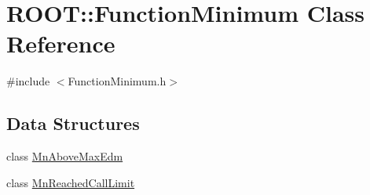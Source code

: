 \hypertarget{classROOT_1_1Minuit2_1_1FunctionMinimum}{}\section{R\+O\+OT\+:\+:Function\+Minimum Class Reference}
\label{classROOT_1_1Minuit2_1_1FunctionMinimum}


{\ttfamily \#include $<$Function\+Minimum.\+h$>$}

\subsection*{Data Structures}
\begin{DoxyCompactItemize}
\item 
class \mbox{\hyperlink{classROOT_1_1Minuit2_1_1FunctionMinimum_1_1MnAboveMaxEdm}{Mn\+Above\+Max\+Edm}}
\item 
class \mbox{\hyperlink{classROOT_1_1Minuit2_1_1FunctionMinimum_1_1MnReachedCallLimit}{Mn\+Reached\+Call\+Limit}}
\end{DoxyCompactItemize}
